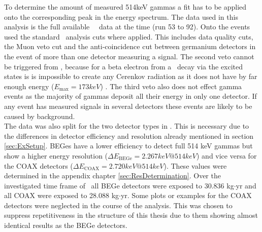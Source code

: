 \documentclass[encoding=utf8,british]{tumphthesis}
\begin{document}
To determine the amount of measured 514keV gammas a fit has to be applied onto the corresponding peak in the energy spectrum.
The data used in this analysis is the full available \gerda\ \PII\ data at the time (run 53 to 92).
Onto the events used the standard \gerda\ analysis cuts where applied.
This includes data quality cuts, the Muon veto cut and the anti-coincidence cut between germanium detectors in the event of more than one detector measuring a signal.
The second veto cannot be triggered from \Kr, because for a beta electron from a \Kr\ decay via the excited  states is is impossible to create any Cerenkov radiation as it does not have by far enough energy ($E_{\mathrm{max}} = 173\unit{keV}$) .
The third veto also does not effect gamma events as the majority of gammas deposit all their energy in only one detector.
If any event has measured signals in several detectors these events are likely to be caused by background.  
\\

The data was also split for the two detector types in \gerda.
This is necessary due to the differences in detector efficiency and resolution already mentioned in section \ref{sec:ExSetup}.
BEGes have a lower efficiency to detect full 514 keV gammas but show a higher energy resolution ($\Delta E_{\mathrm{BEGe}} = 2.267\unit{keV}  @ 514 \unit{keV}$) and vice versa for the COAX detectors ($\Delta E_{\mathrm{COAX}} = 2.720\unit{keV} @ 514 \unit{keV}$).
These values were determined in the appendix chapter \ref{sec:ResDetermination}.
Over the investigated time frame of \PII\ all BEGe detectors were exposed to 30.836 kg$\cdot$yr and all COAX were exposed to 28.088 kg$\cdot$yr.
Some plots or examples for the COAX detectors were neglected in the course of the analysis.
This was chosen to suppress repetitiveness in the structure of this thesis due to them showing almost identical results as the BEGe detectors.
\\
\end{document}
